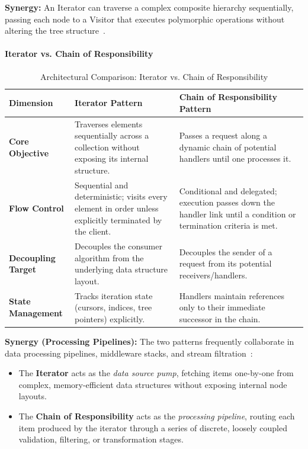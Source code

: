 \noindent \textbf{Synergy:} An Iterator can traverse a complex composite hierarchy sequentially, passing each node to a Visitor that executes polymorphic operations without altering the tree structure~\cite{gof1994}.

\paragraph{Iterator vs. Chain of Responsibility}

\begin{table}[htbp]
\centering
\caption{Architectural Comparison: Iterator vs. Chain of Responsibility}
\label{tab:iterator_vs_cor}
\begin{tabular}{@{}p{3.5cm} p{5.5cm} p{5.5cm}@{}}
\toprule
\textbf{Dimension} & \textbf{Iterator Pattern}~\cite{gof1994} & \textbf{Chain of Responsibility Pattern}~\cite{gof1994} \\ \midrule
\textbf{Core Objective} & Traverses elements sequentially across a collection without exposing its internal structure. & Passes a request along a dynamic chain of potential handlers until one processes it. \\ \midrule
\textbf{Flow Control} & Sequential and deterministic; visits every element in order unless explicitly terminated by the client. & Conditional and delegated; execution passes down the handler link until a condition or termination criteria is met. \\ \midrule
\textbf{Decoupling Target} & Decouples the consumer algorithm from the underlying data structure layout. & Decouples the sender of a request from its potential receivers/handlers. \\ \midrule
\textbf{State Management} & Tracks iteration state (cursors, indices, tree pointers) explicitly. & Handlers maintain references only to their immediate successor in the chain. \\ \bottomrule
\end{tabular}
\end{table}

\noindent \textbf{Synergy (Processing Pipelines):}
The two patterns frequently collaborate in data processing pipelines, middleware stacks, and stream filtration~\cite{refactoring_guru_iterator}:
\begin{itemize}
    \item The \textbf{Iterator} acts as the \textit{data source pump}, fetching items one-by-one from complex, memory-efficient data structures without exposing internal node layouts.
    \item The \textbf{Chain of Responsibility} acts as the \textit{processing pipeline}, routing each item produced by the iterator through a series of discrete, loosely coupled validation, filtering, or transformation stages.
\end{itemize}

